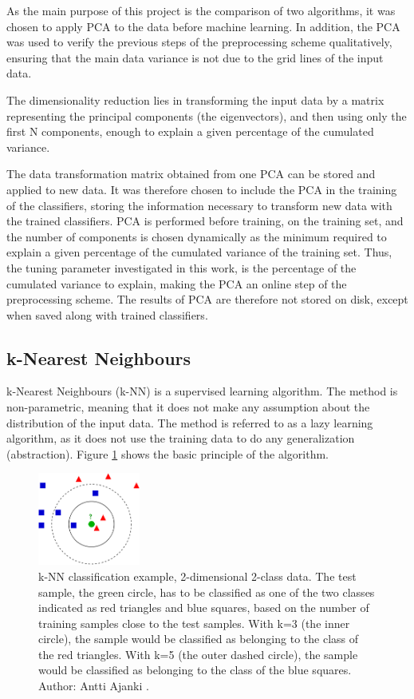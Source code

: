 As the main purpose of this project is the comparison of two algorithms,
it was chosen to apply PCA to the data before machine learning.
In addition, the PCA was used to verify the previous
steps of the preprocessing scheme qualitatively,
ensuring that the main data variance is not due to the grid lines of the input data.

The dimensionality reduction lies in transforming the input
data by a matrix representing the principal components
(the eigenvectors), and then using only the
first N components, enough to explain a given percentage of the cumulated variance.

The data transformation matrix obtained from one PCA
can be stored and applied to new data.
It was therefore chosen to include the PCA in the training of the classifiers,
storing the information necessary to transform new data
with the trained classifiers.
PCA is performed before training, on the training set,
and the number of components is chosen dynamically as the minimum
required to explain a given percentage of the cumulated variance
of the training set.
Thus, the tuning parameter investigated in this work,
is the percentage of the cumulated variance to explain,
making the PCA an online step of the preprocessing scheme.
The results of PCA are therefore not stored on disk,
except when saved along with trained classifiers.

\subsection{k-Nearest Neighbours}
k-Nearest Neighbours (k-NN)
is a supervised learning algorithm.
The method is non-parametric,
meaning that it does not make any assumption about the distribution of the input data.
The method is referred to as a lazy learning algorithm,
as it does not use the training data to do any generalization (abstraction).
Figure \ref{fig:knn-example} \citep{knnwiki} shows the basic principle of the algorithm.
\begin{figure}[h]
\centering
\includegraphics[width = 0.3\textwidth]{img/kNN-classification.png}
\caption[k-NN classification example]{
k-NN classification example, 2-dimensional 2-class data.
The test sample, the green circle,
has to be classified as one of the two classes indicated
as red triangles and blue squares, based on the number
of training samples close to the test samples.
With k=3 (the inner circle), the sample would be classified as belonging
to the class of the red triangles.
With k=5 (the outer dashed circle), the sample would be classified as belonging
to the class of the blue squares.
Author: Antti Ajanki \citep{knnwiki}.
}
\label{fig:knn-example}
\end{figure}


